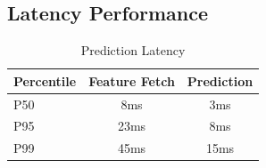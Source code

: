 \subsection{Latency Performance}

\begin{table}[h]
\centering
\caption{Prediction Latency}
\begin{tabular}{lcc}
\toprule
\textbf{Percentile} & \textbf{Feature Fetch} & \textbf{Prediction} \\
\midrule
P50 & 8ms & 3ms \\
P95 & 23ms & 8ms \\
P99 & 45ms & 15ms \\
\bottomrule
\end{tabular}
\end{table}


